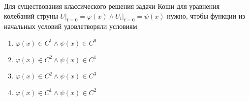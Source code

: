 Для существования классического решения задачи Коши для уравнения колебаний струны \(U\vert _{t=0}=\varphi (x)\land U_t\vert _{t=0}=\psi (x)\) нужно, чтобы функции из начальных условий удовлетворяли условиям

\begin{enumerate}[label=\arabic*)]
    \item \(\varphi (x)\in C^1 \land \psi (x)\in C^0\)
    \item \(\varphi (x)\in C^2 \land \psi (x)\in C^1\)
    \item \(\varphi (x)\in C^2 \land \psi (x)\in C^3\)
    \item \(\varphi (x)\in C^1 \land \psi (x)\in C^2\)
\end{enumerate}


